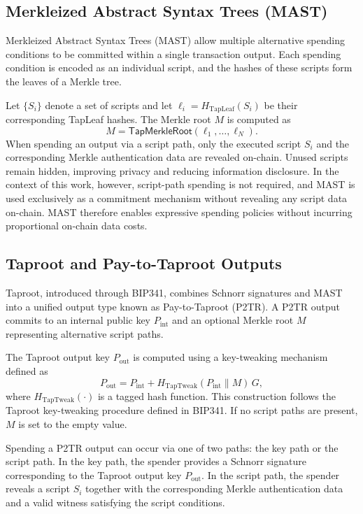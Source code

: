 \documentclass{ieeeaccess}
\begin{document}
\subsection{Merkleized Abstract Syntax Trees (MAST)}

Merkleized Abstract Syntax Trees (MAST) allow multiple alternative spending conditions to be committed within a single transaction output.
Each spending condition is encoded as an individual script, and the hashes of these scripts form the leaves of a Merkle tree.

Let $\{S_i\}$ denote a set of scripts and let $\ell_i = H_{\text{TapLeaf}}(S_i)$ be their corresponding TapLeaf hashes.
The Merkle root $M$ is computed as
\[
M = \textsf{TapMerkleRoot}(\ell_1, \ldots, \ell_N).
\]
When spending an output via a script path, only the executed script $S_i$ and the corresponding Merkle authentication data are revealed on-chain.
Unused scripts remain hidden, improving privacy and reducing information disclosure.
In the context of this work, however, script-path spending is not required, and MAST is used exclusively as a commitment mechanism without revealing any script data on-chain.
MAST therefore enables expressive spending policies without incurring proportional on-chain data costs.

\subsection{Taproot and Pay-to-Taproot Outputs}

Taproot, introduced through BIP341, combines Schnorr signatures and MAST into a unified output type known as Pay-to-Taproot (P2TR).
A P2TR output commits to an internal public key $P_{\text{int}}$ and an optional Merkle root $M$ representing alternative script paths.

The Taproot output key $P_{\text{out}}$ is computed using a key-tweaking mechanism defined as
\[
P_{\text{out}} = P_{\text{int}} + H_{\text{TapTweak}}(P_{\text{int}} \parallel M)\,G,
\]
where $H_{\text{TapTweak}}(\cdot)$ is a tagged hash function.
This construction follows the Taproot key-tweaking procedure defined in BIP341.
If no script paths are present, $M$ is set to the empty value.

Spending a P2TR output can occur via one of two paths: the key path or the script path.
In the key path, the spender provides a Schnorr signature corresponding to the Taproot output key $P_{\text{out}}$.
In the script path, the spender reveals a script $S_i$ together with the corresponding Merkle authentication data and a valid witness satisfying the script conditions.
\end{document}
